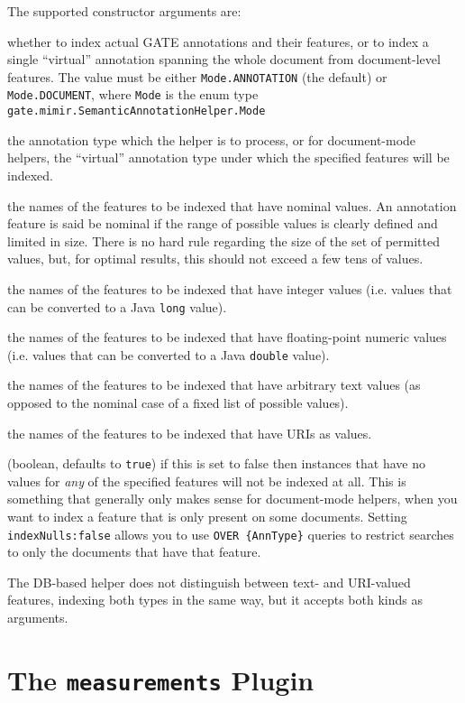 The supported constructor arguments are:
\bde
\item[mode:] whether to index actual GATE annotations and their features, or to
  index a single ``virtual'' annotation spanning the whole document from
  document-level features.  The value must be either \verb!Mode.ANNOTATION!
  (the default) or \verb!Mode.DOCUMENT!, where \verb!Mode! is the enum type
  \verb!gate.mimir.SemanticAnnotationHelper.Mode!
\item[annType:] the annotation type which the helper is to process, or for
  document-mode helpers, the ``virtual'' annotation type under which the
  specified features will be indexed.
\item[nominalFeatures:] the names of the features to be indexed that have
  nominal values. An annotation feature is said be nominal if the range of
  possible values is clearly defined and limited in size. There is no hard rule
  regarding the size of the set of permitted values, but, for optimal results,
  this should not exceed a few tens of values.
\item[integerFeatures:] the names of the features to be indexed that have
  integer values (i.e. values that can be converted to a Java {\tt long}
  value).
\item[floatFeatures:] the names of the features to be indexed that have
  floating-point numeric values (i.e. values that can be converted to a Java
  {\tt double} value).
\item[textFeatures:] the names of the features to be indexed that have
  arbitrary text values (as opposed to the nominal case of a fixed list of
  possible values).
\item[uriFeatures:] the names of the features to be indexed that have
  URIs as values.
\item[indexNulls:] (boolean, defaults to \verb!true!) if this is set to false
  then instances that have no values for {\em any} of the specified features
  will not be indexed at all.  This is something that generally only makes
  sense for document-mode helpers, when you want to index a feature that is
  only present on some documents.  Setting \verb!indexNulls:false! allows you
  to use \verb!OVER {AnnType}! queries to restrict searches to only the
  documents that have that feature.
\ede

The DB-based helper does not distinguish between text- and URI-valued features,
indexing both types in the same way, but it accepts both kinds as arguments.

\section{The {\tt measurements} Plugin}\label{sec:plugins:measurements}

